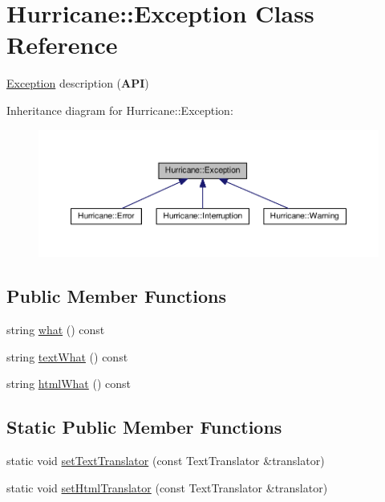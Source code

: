 \hypertarget{classHurricane_1_1Exception}{}\section{Hurricane\+:\+:Exception Class Reference}
\label{classHurricane_1_1Exception}


\hyperlink{classHurricane_1_1Exception}{Exception} description ({\bfseries A\+PI})  




Inheritance diagram for Hurricane\+:\+:Exception\+:\nopagebreak
\begin{figure}[H]
\begin{center}
\leavevmode
\includegraphics[width=350pt]{classHurricane_1_1Exception__inherit__graph}
\end{center}
\end{figure}
\subsection*{Public Member Functions}
\begin{DoxyCompactItemize}
\item 
string \hyperlink{classHurricane_1_1Exception_a6d8036af345628567494eeab9c8e2e3a}{what} () const
\item 
string \hyperlink{classHurricane_1_1Exception_a19b5d24e8f02bb99625a5206638c44e8}{text\+What} () const
\item 
string \hyperlink{classHurricane_1_1Exception_a2582e6c3acb236e24f48cb873f64e3e9}{html\+What} () const
\end{DoxyCompactItemize}
\subsection*{Static Public Member Functions}
\begin{DoxyCompactItemize}
\item 
static void \hyperlink{classHurricane_1_1Exception_a1a57fbbc4b57a014558ba31d18ec9b62}{set\+Text\+Translator} (const Text\+Translator \&translator)
\item 
static void \hyperlink{classHurricane_1_1Exception_a0effe808df00f4efe10925131304b8d0}{set\+Html\+Translator} (const Text\+Translator \&translator)
\end{DoxyCompactItemize}


